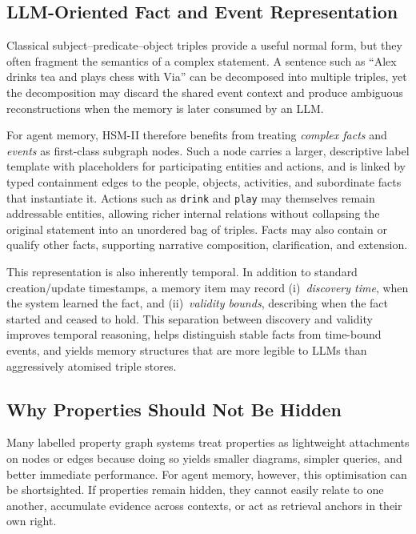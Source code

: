 \documentclass[11pt]{article}
\begin{document}
\subsection{LLM-Oriented Fact and Event Representation}

Classical subject--predicate--object triples provide a useful normal form, but
they often fragment the semantics of a complex statement. A sentence such as
``Alex drinks tea and plays chess with Via'' can be decomposed into multiple
triples, yet the decomposition may discard the shared event context and produce
ambiguous reconstructions when the memory is later consumed by an LLM.

For agent memory, HSM-II therefore benefits from treating \emph{complex facts} and
\emph{events} as first-class subgraph nodes. Such a node carries a larger,
descriptive label template with placeholders for participating entities and
actions, and is linked by typed containment edges to the people, objects,
activities, and subordinate facts that instantiate it. Actions such as
\texttt{drink} and \texttt{play} may themselves remain addressable entities,
allowing richer internal relations without collapsing the original statement into
an unordered bag of triples. Facts may also contain or qualify other facts,
supporting narrative composition, clarification, and extension.

This representation is also inherently temporal. In addition to standard
creation/update timestamps, a memory item may record (i)~\emph{discovery time},
when the system learned the fact, and (ii)~\emph{validity bounds}, describing
when the fact started and ceased to hold. This separation between discovery and
validity improves temporal reasoning, helps distinguish stable facts from
time-bound events, and yields memory structures that are more legible to LLMs
than aggressively atomised triple stores.

\subsection{Why Properties Should Not Be Hidden}

Many labelled property graph systems treat properties as lightweight attachments
on nodes or edges because doing so yields smaller diagrams, simpler queries, and
better immediate performance. For agent memory, however, this optimisation can be
shortsighted. If properties remain hidden, they cannot easily relate to one
another, accumulate evidence across contexts, or act as retrieval anchors in
their own right.
\end{document}
